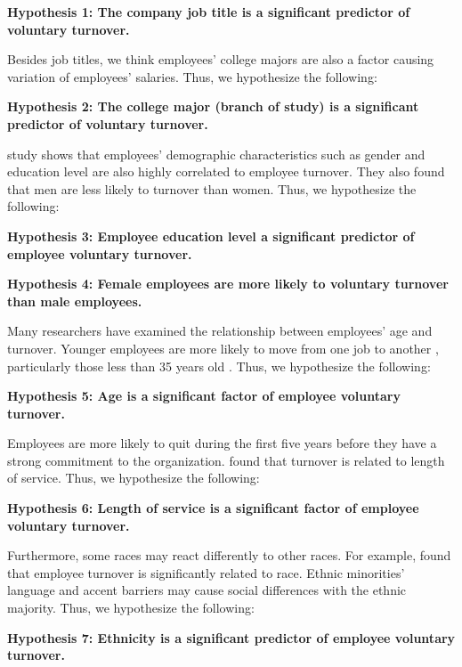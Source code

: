 \textbf{Hypothesis 1: The company job title is a significant predictor of voluntary turnover.}

Besides job titles, we think employees' college majors are also a factor causing variation of employees' salaries. Thus, we hypothesize the following:

\textbf{Hypothesis 2: The college major (branch of study) is a significant predictor of voluntary turnover. }

\citet{griffeth2000} study shows that employees' demographic characteristics such as gender and education level are also highly correlated to employee turnover. They also found that men are less likely to turnover than women. Thus, we hypothesize the following:

\textbf{Hypothesis 3: Employee education level a significant predictor of employee voluntary turnover.}


\textbf{Hypothesis 4: Female employees are more likely to voluntary turnover than male employees.}

Many researchers have examined the relationship between employees' age and turnover. Younger employees are more likely to move from one job to another \citep{burke1994}, particularly those less than 35 years old \citep{RN45}. Thus, we hypothesize the following:

\textbf{Hypothesis 5: Age is a significant factor of employee voluntary turnover.}

Employees are more likely to quit during the first five years before they have a strong commitment to the organization. \citet{bluedorn1982} found that turnover is related to length of service. Thus, we hypothesize the following:

\textbf{Hypothesis 6: Length of service is a significant factor of employee voluntary turnover.}

Furthermore, some races may react differently to other races. For example, \citet{RN42} found that employee turnover is significantly related to race. Ethnic minorities' language and accent barriers may cause social differences with the ethnic majority. Thus, we hypothesize the following:

\textbf{Hypothesis 7: Ethnicity is a significant predictor of employee voluntary turnover.}

